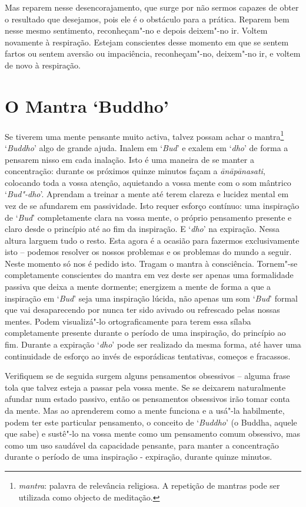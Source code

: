 Mas reparem nesse desencorajamento, que surge por não sermos capazes de
obter o resultado que desejamos, pois ele é o obstáculo para a prática.
Reparem bem nesse mesmo sentimento, reconheçam"-no e depois deixem"-no ir.
Voltem novamente à respiração. Estejam conscientes desse momento em que
se sentem fartos ou sentem aversão ou impaciência, reconheçam"-no,
deixem"-no ir, e voltem de novo à respiração.

\chapter{O Mantra `Buddho'}


Se tiverem uma mente pensante muito activa, talvez possam achar o
mantra\footnote{%
  \emph{mantra}: palavra de relevância religiosa. A repetição de mantras pode
  ser utilizada como objecto de meditação.}
`\emph{Buddho}' algo de grande ajuda. Inalem em `\emph{Bud}' e
exalem em `\emph{dho}' de forma a pensarem nisso em cada inalação. Isto
é uma maneira de se manter a concentração: durante os próximos quinze
minutos façam a \emph{ānāpānasati}, colocando toda a vossa atenção,
aquietando a vossa mente com o som mântrico `\emph{Bud"-dho}'. Aprendam a
treinar a mente até terem clareza e lucidez mental em vez de se
afundarem em passividade. Isto requer esforço contínuo: uma inspiração de
`\emph{Bud}' completamente clara na vossa mente, o próprio pensamento
presente e claro desde o princípio até ao fim da inspiração. E
`\emph{dho}' na expiração. Nessa altura larguem tudo o resto. Esta agora
é a ocasião para fazermos exclusivamente isto -- podemos resolver os
nossos problemas e os problemas do mundo a seguir. Neste momento só nos
é pedido isto. Tragam o mantra à consciência. Tornem"-se completamente
conscientes do mantra em vez deste ser apenas uma formalidade passiva
que deixa a mente dormente; energizem a mente de forma a que a inspiração
em `\emph{Bud}' seja uma inspiração lúcida, não apenas um som `\emph{Bud}'
formal que vai desaparecendo por nunca ter sido avivado ou refrescado
pelas nossas mentes. Podem visualizá"-lo ortograficamente para terem essa
sílaba completamente presente durante o período de uma inspiração, do
princípio ao fim. Durante a expiração `\emph{dho}' pode ser realizado da
mesma forma, até haver uma continuidade de esforço ao invés de
esporádicas tentativas, começos e fracassos.

Verifiquem se de seguida surgem alguns pensamentos obsessivos -- alguma
frase tola que talvez esteja a passar pela vossa mente. Se se deixarem
naturalmente afundar num estado passivo, então os pensamentos obsessivos
irão tomar conta da mente. Mas ao aprenderem como a mente funciona e a
usá"-la habilmente, podem ter este particular pensamento, o conceito de
`\emph{Buddho}' (o Buddha, aquele que sabe) e sustê"-lo na vossa mente
como um pensamento comum obsessivo, mas como um uso saudável da
capacidade pensante, para manter a concentração durante o período de uma
inspiração - expiração, durante quinze minutos.

